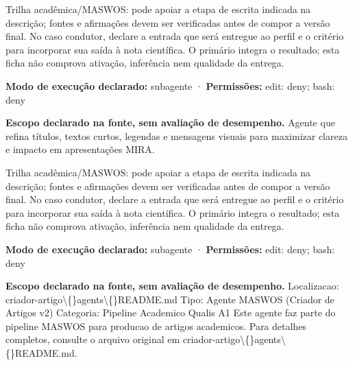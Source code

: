 \begin{funcao}
Trilha acadêmica/MASWOS: pode apoiar a etapa de escrita indicada na descrição; fontes e afirmações devem ser verificadas antes de compor a versão final. No caso condutor, declare a entrada que será entregue ao perfil e o critério para incorporar sua saída à nota científica. O primário integra o resultado; esta ficha não comprova ativação, inferência nem qualidade da entrega.
\end{funcao}

\begin{arquitetura}
\textbf{Modo de execução declarado:} subagente · \textbf{Permissões:} edit: deny; bash: deny
\end{arquitetura}


\begin{descricao}
\textbf{Escopo declarado na fonte, sem avaliação de desempenho.}
Agente que refina títulos, textos curtos, legendas e mensagens visuais para maximizar clareza e impacto em apresentações MIRA.
\end{descricao}

\begin{funcao}
Trilha acadêmica/MASWOS: pode apoiar a etapa de escrita indicada na descrição; fontes e afirmações devem ser verificadas antes de compor a versão final. No caso condutor, declare a entrada que será entregue ao perfil e o critério para incorporar sua saída à nota científica. O primário integra o resultado; esta ficha não comprova ativação, inferência nem qualidade da entrega.
\end{funcao}

\begin{arquitetura}
\textbf{Modo de execução declarado:} subagente · \textbf{Permissões:} edit: deny; bash: deny
\end{arquitetura}


\begin{descricao}
\textbf{Escopo declarado na fonte, sem avaliação de desempenho.}
Localizacao: criador-artigo\textbackslash\{\}agents\textbackslash\{\}README.md Tipo: Agente MASWOS (Criador de Artigos v2) Categoria: Pipeline Academico Qualis A1 Este agente faz parte do pipeline MASWOS para producao de artigos academicos. Para detalhes completos, consulte o arquivo original em criador-artigo\textbackslash\{\}agents\textbackslash\{\}README.md.
\end{descricao}

